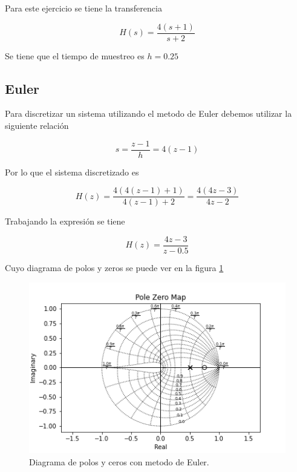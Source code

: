 \documentclass{article}
\begin{document}
        Para este ejercicio se tiene la transferencia 

        \begin{equation}
            H(s) = \frac{4(s+1)}{s + 2}
        \end{equation}

        Se tiene que el tiempo de muestreo es $h=0.25$

        \subsection{Euler}

        Para discretizar un sistema utilizando el metodo de Euler debemos utilizar la siguiente relación 

        \begin{equation}
            s = \frac{z - 1}{h} = 4 ( z - 1 )
        \end{equation}

        Por lo que el sistema discretizado es 

        \begin{equation}
            H(z) = \frac{ 4 ( 4(z-1) + 1 ) }{ 4(z-1) + 2 } = \frac{4( 4z-3 )}{4z - 2}
        \end{equation}

        Trabajando la expresión se tiene 

        \begin{equation}
            H(z) = \frac{4z - 3}{z - 0.5}
        \end{equation}

        Cuyo diagrama de polos y zeros se puede ver en la figura \ref{fig:3-euler}

        \begin{figure}[!htb]
            \centering
            \includegraphics[width=\textwidth]{Img/3-euler.png}
            \caption{Diagrama de polos y ceros con metodo de Euler.}
            \label{fig:3-euler}
        \end{figure}
\end{document}
